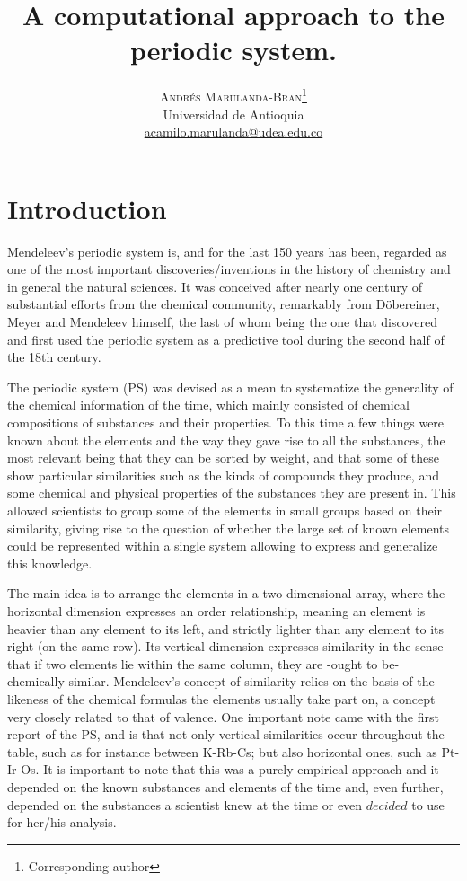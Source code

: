 \documentclass[]{article}
\begin{document}
\title{A computational approach to the periodic system.} 

\author{%
\textsc{Andr\'es Marulanda-Bran}\thanks{Corresponding author} \\[1ex]
\normalsize Universidad de Antioquia \\ %
\normalsize \href{mailto:correoAndres}{acamilo.marulanda@udea.edu.co} %
}


\maketitle


\section{Introduction}
\label{sec:intro}

Mendeleev's periodic system is, and for the last 150 years has been, regarded as one of the most important discoveries/inventions in the history of chemistry and in general the natural sciences. It was conceived after nearly one century of substantial efforts from the chemical community, remarkably from D\"obereiner, Meyer and Mendeleev himself, the last of whom being the one that discovered and first used the periodic system as a predictive tool during the second half of the 18th century.

The periodic system (PS) was devised as a mean to systematize the generality of the chemical information of the time, which mainly consisted of chemical compositions of substances and their properties. To this time a few things were known about the elements and the way they gave rise to all the substances, the most relevant being that they can be sorted by weight, and that some of these show particular similarities such as the kinds of compounds they produce, and some chemical and physical properties of the substances they are present in. This allowed scientists to group some of the elements in small groups based on their similarity, giving rise to the question of whether the large set of known elements could be represented within a single system allowing to express and generalize this knowledge.

The main idea is to arrange the elements in a two-dimensional array, where the horizontal dimension expresses an order relationship, meaning an element is heavier than any element to its left, and strictly lighter than any element to its right (on the same row). Its vertical dimension expresses similarity in the sense that if two elements lie within the same column, they are -ought to be- chemically similar. Mendeleev's concept of similarity relies on the basis of the likeness of the chemical formulas the elements usually take part on, a concept very closely related to that of valence. One important note came with the first report of the PS, and is that not only vertical similarities occur throughout the table, such as for instance between K-Rb-Cs; but also horizontal ones, such as Pt-Ir-Os. It is important to note that this was a purely empirical approach and it depended on the known substances and elements of the time and, even further, depended on the substances a scientist knew at the time or even $\textit{decided}$ to use for her/his analysis. 
\end{document}
